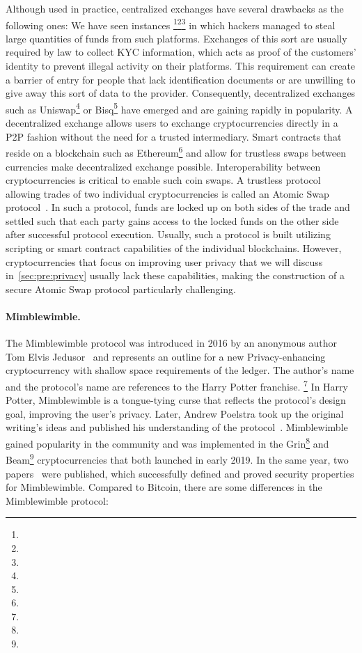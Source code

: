 Although used in practice, centralized exchanges have several drawbacks as the following ones:
We have seen instances \footnote{\urlmtgox}\footnote{\urlbitgrail}\footnote{\urlquadriga} in which hackers managed to steal large quantities of funds from such platforms.
Exchanges of this sort are usually required by law to collect KYC information, which acts as proof of the customers' identity to prevent illegal activity on their platforms.
This requirement can create a barrier of entry for people that lack identification documents or are unwilling to give away this sort of data to the provider.
Consequently, decentralized exchanges such as Uniswap\footnote{\urluniswp} or Bisq\footnote{\urlbisq} have emerged and are gaining rapidly in popularity.
A decentralized exchange allows users to exchange cryptocurrencies directly in a P2P fashion without the need for a trusted intermediary.
Smart contracts that reside on a blockchain such as Ethereum\footnote{\urlethereum} and allow for trustless swaps between currencies make decentralized exchange possible.
Interoperability between cryptocurrencies is critical to enable such coin swaps.
A trustless protocol allowing trades of two individual cryptocurrencies is called an Atomic Swap protocol~\cite{herlihy2018atomic}.
In such a protocol, funds are locked up on both sides of the trade and settled such that each party gains access to the locked funds on the other side after successful protocol execution.
Usually, such a protocol is built utilizing scripting or smart contract capabilities of the individual blockchains.
However, cryptocurrencies that focus on improving user privacy that we will discuss in~\cref{sec:pre:privacy} usually lack these capabilities, making the construction of a secure Atomic Swap protocol particularly challenging.

\paragraph{Mimblewimble.} The Mimblewimble protocol was introduced in 2016 by an anonymous author Tom Elvis Jedusor~\cite{jedusor2016mimblewimble} and represents an outline for a new Privacy-enhancing cryptocurrency with shallow space requirements of the ledger.
The author’s name and the protocol's name are references to the Harry Potter franchise. \footnote{\urlharrypotter}
In Harry Potter, Mimblewimble is a tongue-tying curse that reflects the protocol's design goal, improving the user's privacy.
Later, Andrew Poelstra took up the original writing's ideas and published his understanding of the protocol~\cite{poelstra2016mimblewimble}.
Mimblewimble gained popularity in the community and was implemented in the Grin\footnote{\urlgrin} and Beam\footnote{\urlbeam} cryptocurrencies that both launched in early 2019.
In the same year, two papers~\cite{fuchsbauer2019aggregate,betarte2019towards} were published, which successfully defined and proved security properties for Mimblewimble.
Compared to Bitcoin, there are some differences in the Mimblewimble protocol:

